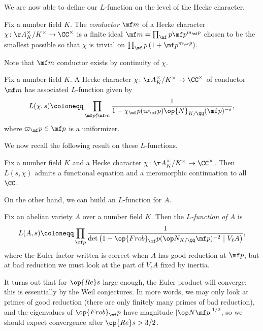 \documentclass[../notes.tex]{subfiles}
\begin{document}
We are now able to define our $L$-function on the level of the Hecke character.
\begin{definition}[conductor]
	Fix a number field $K$. The \textit{conductor} $\mf m$ of a Hecke character $\chi\colon\AA_K^\times/K^\times\to\CC^\times$ is a finite ideal $\mf m=\prod_\mf p\mf p^{m_\mf p}$ chosen to be the smallest possible so that $\chi$ is trivial on $\prod_\mf p\left(1+\mf p^{m_\mf p}\right)$.
\end{definition}
Note that $\mf m$ conductor exists by continuity of $\chi$.
\begin{definition}
	Fix a number field $K$. A Hecke character $\chi\colon\AA_K^\times/K^\times\to\CC^\times$ of conductor $\mf m$ has associated $L$-function given by
	\[L(\chi,s)\coloneqq\prod_{\mf p\nmid\mf m}\frac1{1-\chi_\mf p(\varpi_\mf p)\op{N}_{K/\QQ}(\mf p)^{-s}},\]
	where $\varpi_\mf p\in\mf p$ is a uniformizer.
\end{definition}
We now recall the following result on these $L$-functions.
\begin{theorem}
	Fix a number field $K$ and a Hecke character $\chi\colon\AA_K^\times/K^\times\to\CC^\times$. Then $L(s,\chi)$ admits a functional equation and a meromorphic continuation to all $\CC$.
\end{theorem}
On the other hand, we can build an $L$-function for $A$.
\begin{definition}
	Fix an abelian variety $A$ over a number field $K$. Then the \textit{$L$-function of $A$} is
	\[L(A,s)\coloneqq\prod_{\mf p}\frac1{\det\left(1-\op{Frob}_\mf p(\op N_{K/\QQ}\mf p)^{-2}~|~V_\ell A\right)},\]
	where the Euler factor written is correct when $A$ has good reduction at $\mf p$, but at bad reduction we must look at the part of $V_\ell A$ fixed by inertia.
\end{definition}
It turns out that for $\op{Re}s$ large enough, the Euler product will converge; this is essentially by the Weil conjectures. In more words, we may only look at primes of good reduction (there are only finitely many primes of bad reduction), and the eigenvalues of $\op{Frob}_\mf p$ have magnitude $\left|\op N\mf p\right|^{1/2}$, so we should expect convergence after $\op{Re}s>3/2$.
\end{document}
